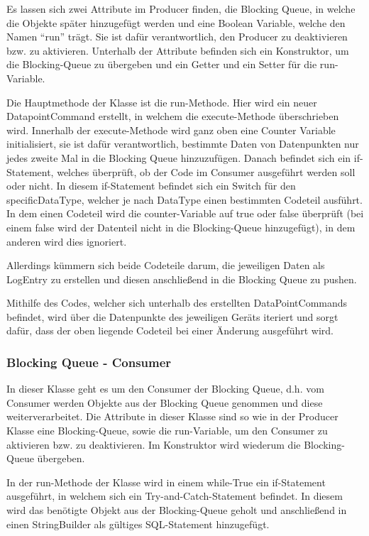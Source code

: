 Es lassen sich zwei Attribute im Producer finden, die Blocking Queue, in welche die Objekte später hinzugefügt werden und eine Boolean Variable, welche den Namen “run” trägt. Sie ist dafür verantwortlich, den Producer zu deaktivieren bzw. zu aktivieren. Unterhalb der Attribute befinden sich ein Konstruktor, um die Blocking-Queue zu übergeben und ein Getter und ein Setter für die run-Variable. 

Die Hauptmethode der Klasse ist die run-Methode. Hier wird ein neuer DatapointCommand erstellt, in welchem die execute-Methode überschrieben wird. Innerhalb der execute-Methode wird ganz oben eine Counter Variable initialisiert, sie ist dafür verantwortlich, bestimmte Daten von Datenpunkten nur jedes zweite Mal in die Blocking Queue hinzuzufügen. Danach befindet sich ein if-Statement, welches überprüft, ob der Code im Consumer ausgeführt werden soll oder nicht. In diesem if-Statement befindet sich ein Switch für den specificDataType, welcher je nach DataType einen bestimmten Codeteil ausführt. In dem einen Codeteil wird die counter-Variable auf true oder false überprüft (bei einem false wird der Datenteil nicht in die Blocking-Queue hinzugefügt), in dem anderen wird dies ignoriert.

Allerdings kümmern sich beide Codeteile darum, die jeweiligen Daten als LogEntry zu erstellen und diesen anschließend in die Blocking Queue zu pushen.

Mithilfe des Codes, welcher sich unterhalb des erstellten DataPointCommands befindet, wird über die Datenpunkte des jeweiligen Geräts iteriert und sorgt dafür, dass der oben liegende Codeteil bei einer Änderung ausgeführt wird.  

\subsubsection{Blocking Queue - Consumer }
In dieser Klasse geht es um den Consumer der Blocking Queue, d.h. vom Consumer werden Objekte aus der Blocking Queue genommen und diese weiterverarbeitet. Die Attribute in dieser Klasse sind so wie in der Producer Klasse eine Blocking-Queue, sowie die run-Variable, um den Consumer zu aktivieren bzw. zu deaktivieren. Im Konstruktor wird wiederum die Blocking-Queue übergeben.

In der run-Methode der Klasse wird in einem while-True ein if-Statement ausgeführt, in welchem sich ein Try-and-Catch-Statement befindet. In diesem wird das benötigte Objekt aus der Blocking-Queue geholt und anschließend in einen StringBuilder als gültiges SQL-Statement hinzugefügt.


